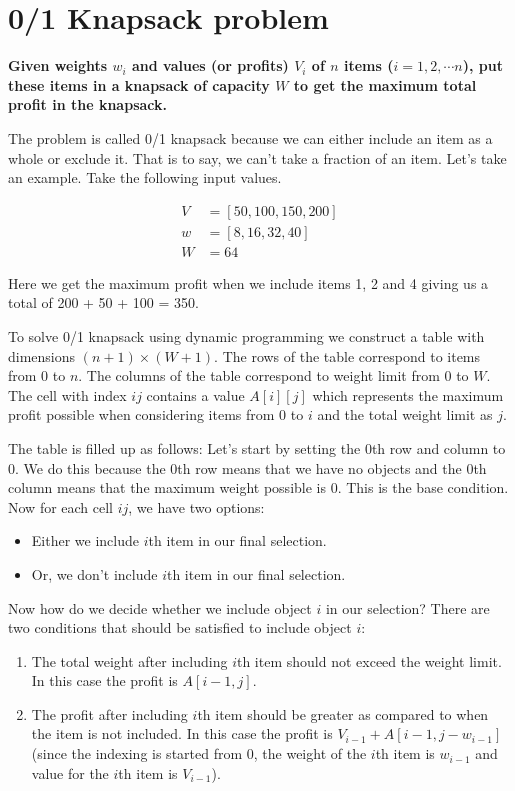 \documentclass[a4paper,11pt]{book}
\begin{document}
\section{0/1 Knapsack problem}

\noindent \textbf{Given weights $w_i$ and values (or profits) $V_i$ of $n$ items ($i = 1,2,\cdots n$), put these items in a knapsack of capacity $W$ to get the maximum total profit in the knapsack.}

\vspace{3mm}

\noindent The problem is called 0/1 knapsack because we can either include an item as a whole or exclude it. That is to say, we can't take a fraction of an item. Let’s take an example. Take the following input values.

\begin{align*}
V &= [50,100,150,200]\\
w &= [8,16,32,40]\\
W &= 64
\end{align*}

\noindent Here we get the maximum profit when we include items 1, 2 and 4 giving us a total of 200 + 50 + 100 = 350.

\noindent To solve 0/1 knapsack using dynamic programming we construct a table with dimensions $(n+1) \times (W+1)$. The rows of the table correspond to items from 0 to $n$. The columns of the table correspond to weight limit from 0 to $W$. The cell with index $ij$ contains a value $A[i][j]$ which represents the maximum profit possible when considering items from 0 to $i$ and the total weight limit as $j$.

\noindent The table is filled up as follows: Let's start by setting the 0th row and column to 0. We do this because the 0th row means that we have no objects and the 0th column means that the maximum weight possible is 0. This is the base condition. Now for each cell $ij$, we have two options:
\begin{itemize}
    \item Either we include $i$th item in our final selection.
    \item Or, we don't include $i$th item in our final selection.
\end{itemize}

\noindent Now how do we decide whether we include object $i$ in our selection? There are two conditions that should be satisfied to include object $i$:
\begin{enumerate}
\item The total weight after including $i$th item should not exceed the weight limit. In this case the profit is $A[i-1,j]$.
\item The profit after including $i$th item should be greater as compared to when the item is not included. In this case the profit is $V_{i-1} + A[i-1,j-w_{i-1}]$ (since the indexing is started from 0, the weight of the $i$th item is $w_{i-1}$ and value for the $i$th item is $V_{i-1}$).
\end{enumerate}
\end{document}
